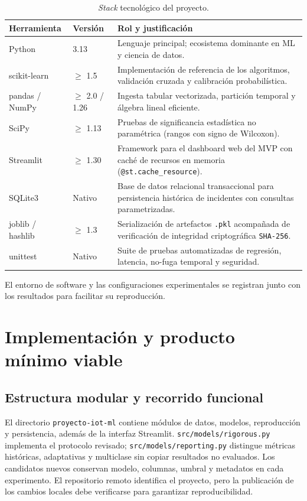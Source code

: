 \documentclass[11pt,a4paper]{article}
\begin{document}
\begin{table}[H]
\centering
\caption{\textit{Stack} tecnológico del proyecto.}
\label{tab:stack}
\small
\begin{tabularx}{\textwidth}{p{2.5cm} p{2.2cm} X}
\toprule
\textbf{Herramienta} & \textbf{Versión} & \textbf{Rol y justificación} \\
\midrule
Python & 3.13 & Lenguaje principal; ecosistema dominante en ML y ciencia de datos. \\
scikit-learn & $\geq$ 1.5 & Implementación de referencia de los algoritmos, validación cruzada y calibración probabilística. \\
pandas / NumPy & $\geq$ 2.0 / 1.26 & Ingesta tabular vectorizada, partición temporal y álgebra lineal eficiente. \\
SciPy & $\geq$ 1.13 & Pruebas de significancia estadística no paramétrica (rangos con signo de Wilcoxon). \\
Streamlit & $\geq$ 1.30 & Framework para el dashboard web del MVP con caché de recursos en memoria (\texttt{@st.cache\_resource}). \\
SQLite3 & Nativo & Base de datos relacional transaccional para persistencia histórica de incidentes con consultas parametrizadas. \\
joblib / hashlib & $\geq$ 1.3 & Serialización de artefactos \texttt{.pkl} acompañada de verificación de integridad criptográfica \texttt{SHA-256}. \\
unittest & Nativo & Suite de pruebas automatizadas de regresión, latencia, no-fuga temporal y seguridad. \\
\bottomrule
\end{tabularx}
\end{table}

El entorno de software y las configuraciones experimentales se registran junto con los resultados para facilitar su reproducción.

\section{Implementación y producto mínimo viable}
\subsection{Estructura modular y recorrido funcional}
El directorio \texttt{proyecto-iot-ml} contiene módulos de datos, modelos, reproducción y persistencia, además de la interfaz Streamlit. \texttt{src/models/rigorous.py} implementa el protocolo revisado; \texttt{src/models/reporting.py} distingue métricas históricas, adaptativas y multiclase sin copiar resultados no evaluados. Los candidatos nuevos conservan modelo, columnas, umbral y metadatos en cada experimento. El repositorio remoto identifica el proyecto, pero la publicación de los cambios locales debe verificarse para garantizar reproducibilidad.
\end{document}
